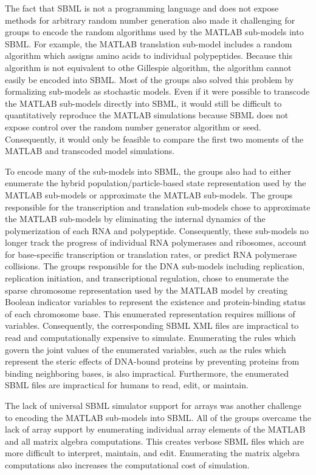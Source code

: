 \documentclass[journal,transmag]{IEEEtran}
\begin{document}
The fact that SBML is not a programming language and does not expose methods for arbitrary random number generation also made it challenging for groups to encode the random algorithms used by the MATLAB sub-models into SBML. For example, the MATLAB translation sub-model includes a random algorithm which assigns amino acids to individual polypeptides. Because this algorithm is not equivalent to othe Gillespie algorithm, the algorithm cannot easily be encoded into SBML. Most of the groups also solved this problem by formalizing sub-models as stochastic models. Even if it were possible to transcode the MATLAB sub-models directly into SBML, it would still be difficult to quantitatively reproduce the MATLAB simulations because SBML does not expose control over the random number generator algorithm or seed. Consequently, it would only be feasible to compare the first two moments of the MATLAB and transcoded model simulations.

To encode many of the sub-models into SBML, the groups also had to either enumerate the hybrid population/particle-based state representation used by the MATLAB sub-models or approximate the MATLAB sub-models. The groups responsible for the transcription and translation sub-models chose to approximate the MATLAB sub-models by eliminating the internal dynamics of the polymerization of each RNA and polypeptide. Consequently, these sub-models no longer track the progress of individual RNA polymerases and ribosomes, account for base-specific transcription or translation rates, or predict RNA polymerase collisions. The groups responsible for the DNA sub-models including replication, replication initiation, and transcriptional regulation, chose to enumerate the sparse chromosome representation used by the MATLAB model by creating Boolean indicator variables to represent the existence and protein-binding status of each chromosome base. This enumerated representation requires millions of variables. Consequently, the corresponding SBML XML files are impractical to read and computationally expensive to simulate. Enumerating the rules which govern the joint values of the enumerated variables, such as the rules which represent the steric effects of DNA-bound proteins by preventing proteins from binding neighboring bases, is also impractical. Furthermore, the enumerated SBML files are impractical for humans to read, edit, or maintain.

The lack of universal SBML simulator support for arrays was another challenge to encoding the MATLAB sub-models into SBML. All of the groups overcame the lack of array support by enumerating individual array elements of the MATLAB and all matrix algebra computations. This creates verbose SBML files which are more difficult to interpret, maintain, and edit. Enumerating the matrix algebra computations also increases the computational cost of simulation.
\end{document}
